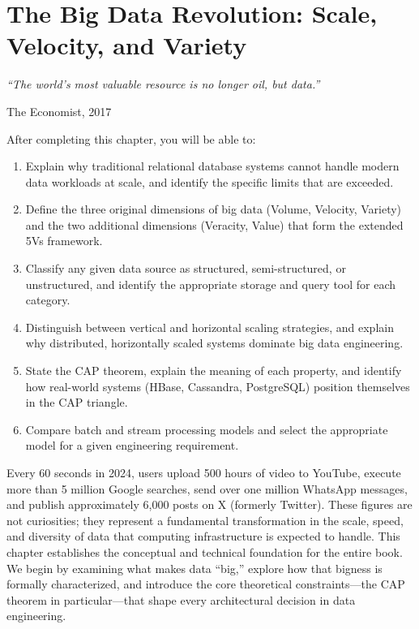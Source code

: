 
\chapter{The Big Data Revolution: Scale, Velocity, and Variety}
\label{ch:foundations}

\epigraph{\textit{``The world's most valuable resource is no longer oil, but data.''}}{The Economist, 2017}

\vspace{4pt}

\begin{chapterlearning}
After completing this chapter, you will be able to:
\begin{enumerate}
  \item Explain why traditional relational database systems cannot handle
        modern data workloads at scale, and identify the specific limits
        that are exceeded.
  \item Define the three original dimensions of big data (Volume,
        Velocity, Variety) and the two additional dimensions (Veracity,
        Value) that form the extended 5Vs framework.
  \item Classify any given data source as structured, semi-structured,
        or unstructured, and identify the appropriate storage and query
        tool for each category.
  \item Distinguish between vertical and horizontal scaling strategies,
        and explain why distributed, horizontally scaled systems dominate
        big data engineering.
  \item State the CAP theorem, explain the meaning of each property, and
        identify how real-world systems (HBase, Cassandra, PostgreSQL)
        position themselves in the CAP triangle.
  \item Compare batch and stream processing models and select the
        appropriate model for a given engineering requirement.
\end{enumerate}
\end{chapterlearning}

\bigskip

Every 60 seconds in 2024, users upload 500 hours of video to YouTube,
execute more than 5 million Google searches, send over one million
WhatsApp messages, and publish approximately 6,000 posts on X (formerly
Twitter). These figures are not curiosities; they represent a
fundamental transformation in the scale, speed, and diversity of data
that computing infrastructure is expected to handle. This chapter
establishes the conceptual and technical foundation for the entire
book. We begin by examining what makes data ``big,'' explore how that
bigness is formally characterized, and introduce the core theoretical
constraints---the CAP theorem in particular---that shape every
architectural decision in data engineering.

